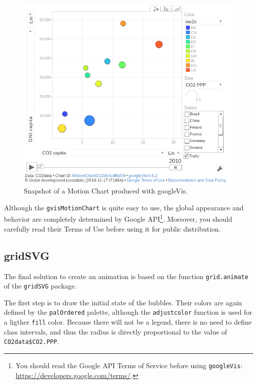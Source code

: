 \begin{figure}
  \centering
  \includegraphics[width=\textwidth]{figs/googleVis}
  \caption{Snapshot of a Motion Chart produced with googleVis.}
  \label{fig:googleVis}
\end{figure}


Although the \texttt{gvisMotionChart} is quite easy to use, the global
appearance and behavior are completely determined by Google
API\footnote{You should read the Google API Terms of Service before using
\texttt{googleVis}: \url{https://developers.google.com/terms/}.}. Moreover, you should carefully read their Terms of Use
before using it for public distribution.

\subsection{\floweroneleft gridSVG \label{sec:gridSVG}}
\label{sec:org5edc07b}
The final solution to create an animation is based on the function
\texttt{grid.animate} of the \texttt{gridSVG} package. 

The first step is to draw the initial state of the bubbles. Their
colors are again defined by the \texttt{palOrdered} palette, although the
\texttt{adjustcolor} function is used for a ligther \texttt{fill} color. Because
there will not be a legend, there is no need to define class
intervals, and thus the radius is directly proportional to the value
of \texttt{CO2data\$CO2.PPP}.


